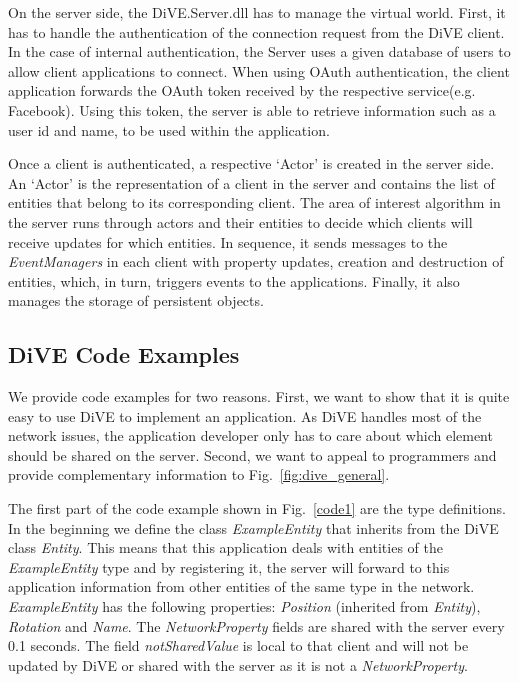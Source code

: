 \documentclass[]{elsarticle}
\newcommand{\comment}[1]{{\color{red}{#1}}}
\begin{document}
On the server side, the DiVE.Server.dll has to manage the virtual world. First, it has to handle the authentication of the connection request from the DiVE client. In the case of internal authentication, the Server uses a given database of users to allow client applications to connect. When using OAuth authentication, the client application forwards the OAuth token received by the respective service(e.g. Facebook). Using this token, the server is able to retrieve information such as a user id and name, to be used within the application.

Once a client is authenticated, a respective `Actor' is created in the server side. An `Actor' is the representation of a client in the server and contains the list of entities that belong to its corresponding client. The area of interest algorithm in the server runs through actors and their entities to decide which clients will receive updates for which entities. In sequence, it sends messages to the \textit{EventManagers} in each client with property updates, creation and destruction of entities, which, in turn, triggers events to the applications.
Finally, it also manages the storage of persistent objects.


\subsection{DiVE Code Examples}

We provide code examples for two reasons. First, we want to show that it is quite easy to use DiVE to implement an application. As DiVE handles most of the network issues, the application developer only has to care about which element should be shared on the server.
Second, we want to appeal to programmers and provide complementary information to Fig.~\ref{fig:dive_general}.

The first part of the code example shown in Fig.~\ref{code1} are the type definitions. In the beginning we define the class \textit{ExampleEntity} that inherits from the DiVE class \textit{Entity}.
This means that this application deals with entities of the \textit{ExampleEntity} type and by registering it, the server will forward to this application information from other entities of the same type in the network.
\textit{ExampleEntity} has the following properties: \textit{Position} (inherited from \textit{Entity}), \textit{Rotation} and \textit{Name}.
The \textit{NetworkProperty} fields are shared with the server every 0.1 seconds. The field \textit{notSharedValue} is local to that client and will not be updated by DiVE or shared with the server as it is not a \textit{NetworkProperty}.
\end{document}
